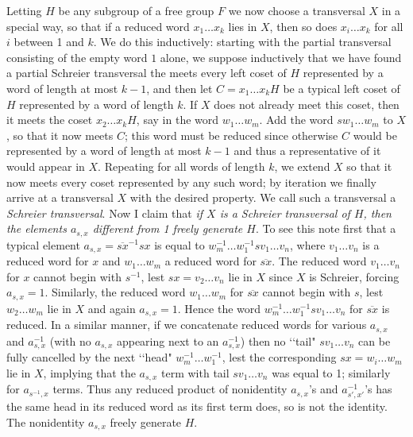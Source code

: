Letting $H$ be any subgroup of a free group $F$ we now choose a transversal $X$ in a special way, so that if a reduced word $x_1\ldots x_k$ lies in $X$, then so does $x_i\ldots x_k$ for all $i$ between 1 and $k$.  We do this inductively:  starting with the partial transversal consisting of the empty word $1$ alone, we suppose inductively that we have found a partial Schreier transversal the meets every left coset of $H$ represented by a word of length at most $k-1$, and then let $C=x_1\ldots x_kH$ be a typical left coset of $H$ represented by a word of length $k$.  If $X$ does not already meet this coset, then it meets the coset $x_2\ldots x_kH$, say in the word $w_1\ldots w_m$.  Add the word $sw_1\ldots w_m$ to $X$, so that it now meets $C$; this word must be reduced since otherwise $C$ would be represented by a word of length at most $k-1$ and thus a representative of it would appear in $X$.  Repeating for all words of length $k$, we extend $X$ so that it now meets every coset represented by any such word; by iteration we finally arrive at a transversal $X$ with the desired property.  We call such a transversal a {\sl Schreier transversal}.  Now I claim that {\sl if $X$ is a Schreier transversal of $H$, then the elements $a_{s,x}$ different from 1 freely generate $H$}.  To see this note first that a typical element $a_{s,x} = \overline{sx}^{-1} sx$ is equal to $w_m^{-1}\ldots w_1^{-1} s v_1\ldots v_n$, where $v_1\ldots v_n$ is a reduced word for $x$ and $w_1\ldots w_m$ a reduced word for $\overline{sx}$.  The reduced word $v_1\ldots v_n$ for $x$ cannot begin with $s^{-1}$, lest $sx = v_2\ldots v_n$ lie in $X$ since $X$ is Schreier, forcing $a_{s,x} = 1$.  Similarly, the reduced word $w_1\ldots w_m$ for $\overline{sx}$ cannot begin with $s$, lest $w_2\ldots w_m$ lie in $X$ and again $a_{s,x} = 1$.  Hence the word $w_m^{-1}\ldots w_1^{-1} s v_1\ldots v_n$ for $\overline{sx}$ is reduced.  In a similar manner, if we concatenate reduced words for various $a_{s,x}$ and
 $a_{s,x}^{-1}$ (with no $a_{s,x}$ appearing next to an $a_{s,x}^{-1}$) then no \lq\lq tail" $s v_1\ldots v_n$ can be fully cancelled by the next \lq\lq head" $w_m^{-1}\ldots w_1^{-1}$, lest the corresponding $sx = w_i\ldots w_m$ lie in $X$, implying that the $a_{s,x}$ term with tail $s v_1\ldots v_n$ was equal to 1; similarly for $a_{s^{-1},x}$ terms.  Thus any reduced product of nonidentity $a_{s,x}$'s and $a_{s',x'}^{-1}$'s has the same head in its reduced word as its first term does, so is not the identity.   The nonidentity $a_{s,x}$ freely generate $H$.
 
